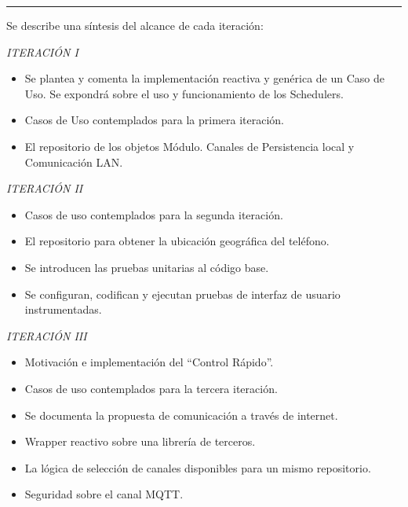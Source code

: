\begin{multicols}{2}
\begin{Figure}
		\rule{\linewidth}{1pt}
		\label{fig:casosusoiter}
	\end{Figure}
	
	\columnbreak
	Se describe una síntesis del alcance de cada iteración:
	{ \small
	
	\emph{ITERACIÓN I} 
	\begin{itemize}
		\item Se plantea y comenta la implementación reactiva y genérica de un Caso de Uso. Se expondrá sobre el uso y funcionamiento de los Schedulers.
		\item Casos de Uso contemplados para la primera iteración.
		\item El repositorio de los objetos Módulo. Canales de Persistencia local y Comunicación LAN.
	\end{itemize}
	
	
	\emph{ITERACIÓN II}
	\begin{itemize}
		\item Casos de uso contemplados para la segunda iteración.
		\item El repositorio para obtener la ubicación geográfica del teléfono.
		\item Se introducen las pruebas unitarias al código base.
		\item Se configuran, codifican y ejecutan pruebas de interfaz de usuario instrumentadas.
	\end{itemize}

	\emph{ITERACIÓN III}
	\begin{itemize}
		\item Motivación e implementación del ``Control Rápido''.
		\item Casos de uso contemplados para la tercera iteración.
		\item Se documenta la propuesta de comunicación a través de internet.
		\item Wrapper reactivo sobre una librería de terceros.
		\item La lógica de selección de canales disponibles para un mismo repositorio.
		\item Seguridad sobre el canal MQTT.	
	\end{itemize}
	}
\end{multicols}





